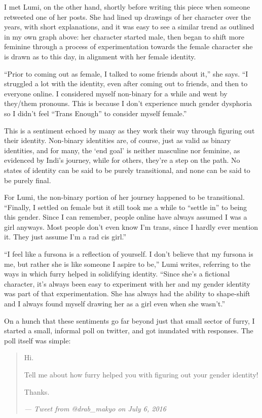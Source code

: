 I met Lumi, on the other hand, shortly before writing this piece when someone retweeted one of her posts.  She had lined up drawings of her character over the years, with short explanations, and it was easy to see a similar trend as outlined in my own graph above: her character started male, then began to shift more feminine through a process of experimentation towards the female character she is drawn as to this day, in alignment with her female identity.

``Prior to coming out as female, I talked to some friends about it,'' she says.  ``I struggled a lot with the identity, even after coming out to friends, and then to everyone online. I considered myself non-binary for a while and went by they/them pronouns. This is because I don't experience much gender dysphoria so I didn't feel ``Trans Enough'' to consider myself female.''

This is a sentiment echoed by many as they work their way through figuring out their identity.  Non-binary identities are, of course, just as valid as binary identities, and for many, the `end goal' is neither masculine nor feminine, as evidenced by Indi's journey, while for others, they're a step on the path.  No states of identity can be said to be purely transitional, and none can be said to be purely final.

For Lumi, the non-binary portion of her journey happened to be transitional.  ``Finally, I settled on female but it still took me a while to ``settle in'' to being this gender. Since I can remember, people online have always assumed I was a girl anyways.  Most people don't even know I'm trans, since I hardly ever mention it. They just assume I'm a rad cis girl.''

``I feel like a fursona is a reflection of yourself. I don't believe that my fursona is me, but rather she is like someone I aspire to be,'' Lumi writes, referring to the ways in which furry helped in solidifying identity.  ``Since she's a fictional character, it's always been easy to experiment with her and my gender identity was part of that experimentation. She has always had the ability to shape-shift and I always found myself drawing her as a girl even when she wasn't.''

\secdiv

On a hunch that these sentiments go far beyond just that small sector of furry, I started a small, informal poll on twitter, and got inundated with responses.  The poll itself was simple:

\begin{quotation}
  Hi.

  Tell me about how furry helped you with figuring out your gender identity!

  Thanks.

  \textit{--- Tweet from @drab\_makyo on July 6, 2016}
\end{quotation}

